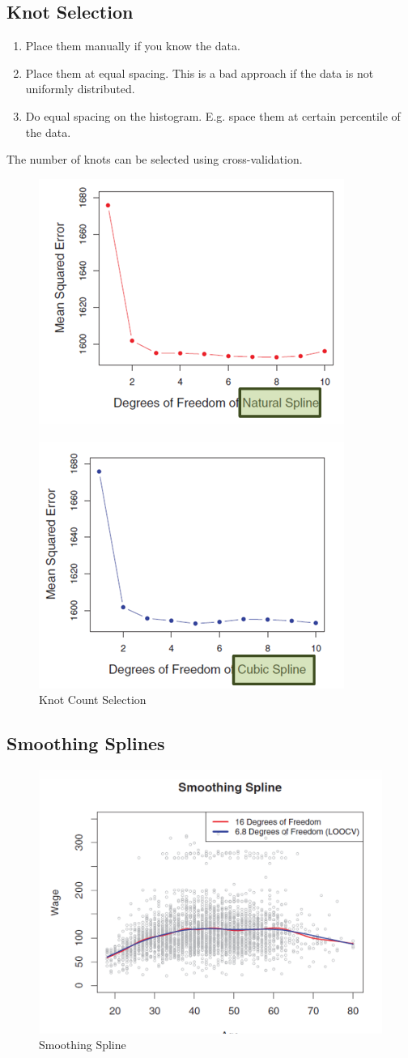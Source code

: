 \documentclass[../Main.tex]{subfiles}
\begin{document}
\subsection{Knot Selection}
\begin{enumerate}
    \item Place them manually if you know the data.
    \item Place them at equal spacing. This is a bad approach if
    the data is not uniformly distributed.
    \item Do equal spacing on the histogram. E.g. space them
    at certain percentile of the data.
\end{enumerate}
The number of knots can be selected using cross-validation.

\begin{figure}[H]
    \centering
    \includegraphics[width=0.5\linewidth]{Images/number-of-knots.png}
    \caption{Knot Count Selection}
\end{figure}

\subsection{Smoothing Splines}

\begin{figure}[H]
    \centering
    \includegraphics[width=0.5\linewidth]{Images/smoothing-spline.png}
    \caption{Smoothing Spline}
\end{figure}
\end{document}
